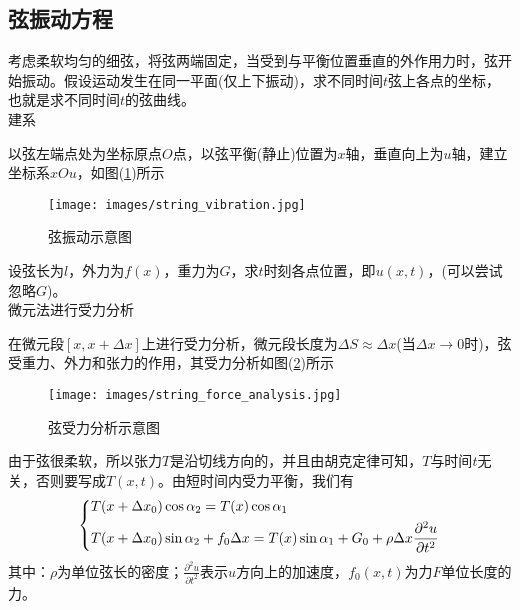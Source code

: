     \subsection{弦振动方程}
        \label{sub:弦振动方程}
        \par
        考虑柔软均匀的细弦，将弦两端固定，当受到与平衡位置垂直的外作用力时，弦开始振动。假设运动发生在同一平面(仅上下振动)，求不同时间$t$弦上各点的坐标，也就是求不同时间$t$的弦曲线。\\
        建系
        \par
        以弦左端点处为坐标原点$O$点，以弦平衡(静止)位置为$x$轴，垂直向上为$u$轴，建立坐标系$xOu$，如图(\ref{fig:弦振动示意图})所示
		\begin{figure}[H]
    		\centering
    		\texttt{[image: images/string\_vibration.jpg]}
    		\caption{弦振动示意图}
    		\label{fig:弦振动示意图}
		\end{figure}
        \par
        设弦长为$l$，外力为$f(x)$，重力为$G$，求$t$时刻各点位置，即$u(x,t)$，(可以尝试忽略$G$)。\\
        微元法进行受力分析
        \par
        在微元段$[x,x+\Delta x]$上进行受力分析，微元段长度为$\Delta S \approx \Delta x$(当$\Delta x \rightarrow 0$时)，弦受重力、外力和张力的作用，其受力分析如图(\ref{fig:弦受力分析示意图})所示
		\begin{figure}[H]
		\centering
		\texttt{[image: images/string\_force\_analysis.jpg]}
		\caption{弦受力分析示意图}
		\label{fig:弦受力分析示意图}
		\end{figure}
        由于弦很柔软，所以张力$T$是沿切线方向的，并且由胡克定律可知，$T$与时间$t$无关，否则要写成$T(x,t)$。由短时间内受力平衡，我们有
        \begin{align}
            \label{弦受力平衡方程}
            \left\{
                \begin{aligned}
                    &T(x+\Delta x_0) \cos \alpha _2 = T(x) \cos \alpha_1\\
                    &T(x+\Delta x_0) \sin \alpha _2 + f_0 \Delta x = T(x) \sin \alpha_1 +G_0 +\rho \Delta x
                    \frac{\partial ^2 u}{\partial t^2} \notag
                \end{aligned}
            \right.
        \end{align}
        其中：$\rho$为单位弦长的密度；$\frac{\partial ^2 u}{\partial t^2}$表示$u$方向上的加速度，$f_0(x,t)$为力$F$单位长度的力。
